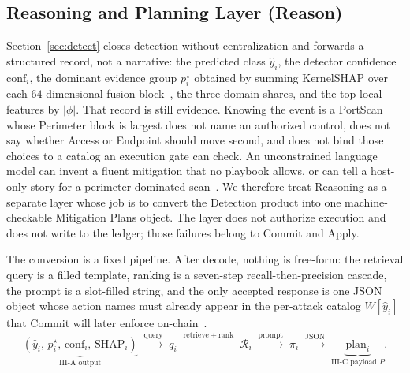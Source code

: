 
\subsection{Reasoning and Planning Layer (Reason)}
\label{sec:reason}

Section~\ref{sec:detect} closes detection-without-centralization and forwards a structured record, not a narrative: the predicted class $\hat{y}_i$, the detector confidence $\mathrm{conf}_i$, the dominant evidence group $p_i^{\star}$ obtained by summing KernelSHAP over each $64$-dimensional fusion block~\cite{wu2023falcon}, the three domain shares, and the top local features by $\lvert\phi\rvert$. That record is still evidence. Knowing the event is a PortScan whose Perimeter block is largest does not name an authorized control, does not say whether Access or Endpoint should move second, and does not bind those choices to a catalog an execution gate can check. An unconstrained language model can invent a fluent mitigation that no playbook allows, or can tell a host-only story for a perimeter-dominated scan~\cite{xi2023,kshetri2025agentic,lazer2026}. We therefore treat Reasoning as a separate layer whose job is to convert the Detection product into one machine-checkable Mitigation Plans object. The layer does not authorize execution and does not write to the ledger; those failures belong to Commit and Apply.

The conversion is a fixed pipeline. After decode, nothing is free-form: the retrieval query is a filled template, ranking is a seven-step recall-then-precision cascade, the prompt is a slot-filled string, and the only accepted response is one JSON object whose action names must already appear in the per-attack catalog $W[\hat{y}_i]$ that Commit will later enforce on-chain~\cite{li2025,jan2025}.
\begin{equation}
\underbrace{(\hat{y}_i,\, p_i^{\star},\, \mathrm{conf}_i,\, \mathrm{SHAP}_i)}_{\text{III-A output}}
\;\xrightarrow{\mathrm{query}}\;
q_i
\;\xrightarrow{\mathrm{retrieve+rank}}\;
\mathcal{R}_i
\;\xrightarrow{\mathrm{prompt}}\;
\pi_i
\;\xrightarrow{\mathrm{JSON}}\;
\underbrace{\mathrm{plan}_i}_{\text{III-C payload } P}.
\label{eq:reason-pipeline}
\end{equation}

